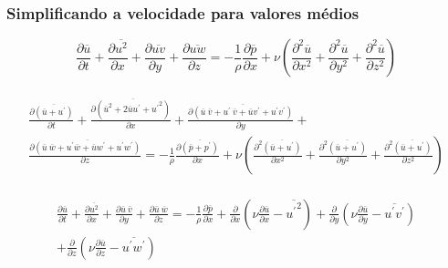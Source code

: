 \documentclass[xcolor=dvipsnames,10pt,aspectratio=169]{beamer}
\begin{document}
	
	
	
	
		
				\begin{frame}
		\frametitle{Simplificando a velocidade para valores médios}
		\begin{equation}
		\frac{\partial \overline{u}}{\partial t} + \frac{\partial \overline{u^2}}{\partial x} + \frac{\partial \overline{uv}}{\partial y} + \frac{\partial \overline{uw}}{\partial z} = - \frac{1}{\rho}  \frac{\partial \overline{p}}{\partial x} + \nu  \left( \frac{\partial^2 \overline{u}}{\partial {x^2}} + \frac{\partial^2 \overline{u}}{\partial y^2} + \frac{\partial^2 \overline{u}}{\partial z^2}   \right)
		\end{equation}
		\\
		\begin{equation}
		\begin{split}
		\frac{\partial \overline{(\overline{u} + u^\prime)}}{\partial t} + \frac{\partial \overline{(\overline{u}^2 + 2  \overline{u}  u^\prime + {u^\prime}^2)}}{\partial x} + \frac{\partial \overline{(\overline{u}\ \overline{v} + u^\prime  \  \overline{v} + \overline{u}  v^\prime + u^\prime  v ^\prime )}}{\partial y} + \\
		\frac{\partial \overline{(\overline{u} \ \overline{w} + u^\prime  \overline{w} + \overline{u}  w^\prime + u^\prime  w ^\prime )}}{\partial z} = - \frac{1}{\rho}  \frac{\partial \overline{(\overline{p} + p ^\prime)}}{\partial x} + \nu  \left( \frac{\partial^2 \overline{(\overline{u} + u^\prime)}}{\partial {x^2}} + \frac{\partial^2 \overline{(\overline{u} + u^\prime)}}{\partial y^2} + \frac{\partial^2 \overline{(\overline{u} + u^\prime)}}{\partial z^2}   \right)
		\end{split}
		\end{equation}
		\\
		\begin{equation}
		\begin{split}
		\frac{\partial \overline{u}}{\partial t} + \frac{\partial \overline{u^2}}{\partial x} + \frac{\partial \overline{u} \ \overline{v}}{\partial y} + \frac{\partial \overline{u} \ \overline{w}}{\partial z} =  - \frac{1}{\rho}  \frac{\partial \overline{{p}}}{\partial x} + \frac{\partial}{\partial x} \left( \nu \frac{\partial \overline{u}}{\partial x} - \overline{{u^\prime}^2}\right) + \frac{\partial}{\partial y} \left( \nu \frac{\partial \overline{u}}{\partial y} - \overline{{u^\prime v^\prime}}\right) \\
		+ \frac{\partial}{\partial z} \left( \nu  \frac{\partial \overline{u}}{\partial z} - \overline{ u ^\prime w ^\prime} \right)
		\end{split}
		\end{equation}
		\end{frame}
		
\end{document}
